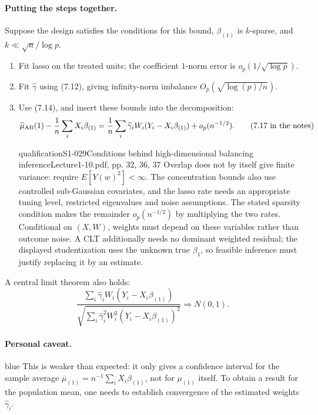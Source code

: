 \paragraph{Putting the steps together.}
Suppose the design satisfies the conditions for this bound, $\beta_{(1)}$ is $k$-sparse, and $k\ll\sqrt n/\log p$.
\begin{enumerate}
\item Fit lasso on the treated units; the coefficient $1$-norm error is $o_p(1/\sqrt{\log p})$.
\item Fit $\widehat\gamma$ using (7.12), giving infinity-norm imbalance $O_p(\sqrt{\log(p)/n})$.
\item Use (7.14), and insert these bounds into the decomposition:
\[
\widehat\mu_{\rm AB}(1)-\frac1n\sum_iX_i\beta_{(1)}
=\frac1n\sum_i\widehat\gamma_iW_i(Y_i-X_i\beta_{(1)})+o_p(n^{-1/2}).
\tag{7.17 in the notes}
\]
\begin{reviewnote}{qualification}{S1-029}{Conditions behind high-dimensional balancing inference}{Lecture1-10.pdf, pp. 32, 36, 37}
Overlap does not by itself give finite variance: require $E[Y(w)^2]<\infty$. The concentration bounds also use controlled sub-Gaussian covariates, and the lasso rate needs an appropriate tuning level, restricted eigenvalues and noise assumptions. The stated sparsity condition makes the remainder $o_p(n^{-1/2})$ by multiplying the two rates. Conditional on $(X,W)$, weights must depend on these variables rather than outcome noise. A CLT additionally needs no dominant weighted residual; the displayed studentization uses the unknown true $\beta_1$, so feasible inference must justify replacing it by an estimate.
\end{reviewnote}

\end{enumerate}
A central limit theorem also holds:
\[
\frac{\sum_i\widehat\gamma_iW_i(Y_i-X_i\beta_{(1)})}
{\sqrt{\sum_i\widehat\gamma_i^2W_i^2(Y_i-X_i\beta_{(1)})^2}}
\Rightarrow N(0,1).
\]
\paragraph{Personal caveat.}
\begin{inkblock}{blue}
This is weaker than expected: it only gives a confidence interval for the sample average
$\overline\mu_{(1)}=n^{-1}\sum_iX_i\beta_{(1)}$, not for $\mu_{(1)}$ itself. To obtain a result for the population mean, one needs to establish convergence of the estimated weights $\widehat\gamma_i$.
\end{inkblock}

